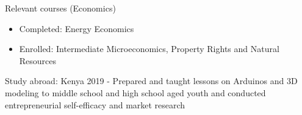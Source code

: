 \begin{cventries}
{\begin{cvitems}
\begin {itemize}
        \end {itemize}
        \ifcv
        \item {Relevant courses (Economics)}
        \begin{itemize}
          \item Completed: Energy Economics
          \item Enrolled: Intermediate Microeconomics, Property Rights and Natural Resources
        \end{itemize}
        \fi
    \ifcv
\item {Study abroad: Kenya 2019 - Prepared and taught lessons on Arduinos and 3D modeling to
middle school and high school aged youth and conducted entrepreneurial self-efficacy and market research }
\fi
      \end{cvitems}
    }
    {}
\end{cventries}